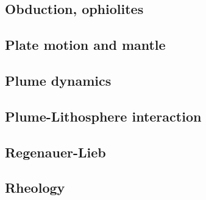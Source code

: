 \subsection*{Obduction, ophiolites}

\cite{hack90}
\cite{hack91}
\cite{agzf14}

\subsection*{Plate motion and mantle}

\cite{zieg92a}
\cite{zhgm98}
\cite{lizh09}
\cite{huss12}
\cite{yoha15}

\subsection*{Plume dynamics}

\cite{nasf94}\cite{hayu94}
\cite{lays99}
\cite{isst06}
\cite{toyu11}\cite{talz11}
\cite{dagm13}
\cite{daso15}
\cite{dacc18}

\subsection*{Plume-Lithosphere interaction}

\cite{rich94}

\subsection*{Regenauer-Lieb}

\cite{reyu00}
\cite{reyu03}
\cite{reyu04}
\cite{rehy06}\cite{rewr06}
\cite{rerw08}
\cite{reps09}
\cite{revp13}

\subsection*{Rheology}

\cite{druc51}
\cite{hafn51}
\cite{drpr52}
\cite{hand69}
\cite{delo81}
\cite{rafi84}
\cite{wica90}
\cite{wasd96}
\cite{rydr00}\cite{rana00}
\cite{lova01}
\cite{hirt02}
\cite{hiko03}
\cite{didr05}\cite{drur05}
\cite{rygw06}
\cite{hirw07}
\cite{lemm08}
\cite{lell11}
\cite{reyn12}
\cite{lepo13}


